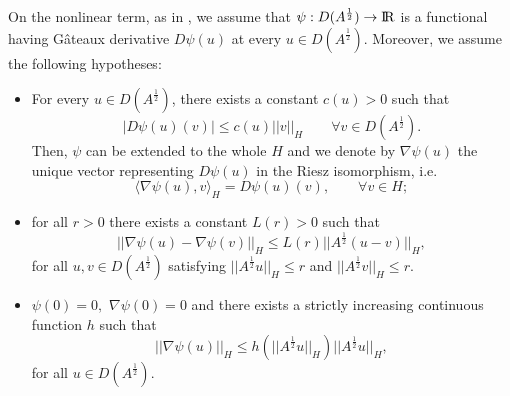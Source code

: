 \documentclass[11pt]{article}
\newcommand{\RR}{{{\rm I} \kern -.15em {\rm R} }}
\renewcommand{\leq}{\leqslant}
\begin{document}
On the nonlinear term, as in \cite{ACS, PP_memory}, we assume that $\psi : D(A^{\frac 1 2})\rightarrow \RR$ is a functional having G\^{a}teaux derivative $D\psi(u)$ at every $u\in D(A^{\frac 12}).$ Moreover, we assume the following hypotheses:
\begin{itemize}
\item[{(H1)}] For every $u\in D(A^{\frac 1 2})$, there exists a constant $c(u)>0$ such that
$$
|D\psi(u)(v)|\leq c(u) ||v||_{{H}} \qquad \forall v\in {D}(A^{\frac 1 2}).
$$
Then, $\psi$ can be extended to the whole  $H$ and we denote by $\nabla \psi(u)$ the unique vector representing $D\psi(u)$ in the Riesz isomorphism, i.e.
$$
\langle \nabla \psi(u), v \rangle_H =D\psi(u) (v), \qquad \forall v\in H;
$$
\item[ (H2)] for all $r>0$ there exists a constant $L(r)>0$ such that
$$
||\nabla \psi (u)-\nabla \psi (v)||_H \leq L(r) ||A^{\frac 12}(u-v)||_H,
$$
for all $u,v\in {D}(A^{\frac 12})$ satisfying $||A^{\frac 12} u||_H\leq r$ and $||A^{\frac 12} v||_H\leq r$.
\item[{ (H3)}] $\psi(0)=0,$  $\nabla \psi(0)=0$ and
there exists a strictly increasing continuous function $h$ such that
\begin{equation}
\label{stima_h}
||\nabla \psi (u)||_H\leq h(||A^{\frac 12} u||_H)||A^{\frac 12}u||_H,
\end{equation}
for all $u\in {D}(A^{\frac 12})$.
\end{itemize}
\end{document}
